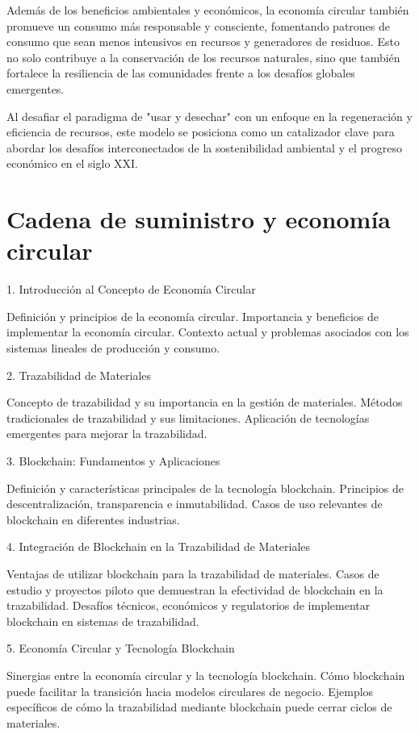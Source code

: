 \documentclass[main.tex]{subfiles}
\begin{document}
Además de los beneficios ambientales y económicos, la economía circular también promueve un consumo más responsable y consciente, fomentando patrones de consumo que sean menos intensivos en recursos y generadores de residuos. Esto no solo contribuye a la conservación de los recursos naturales, sino que también fortalece la resiliencia de las comunidades frente a los desafíos globales emergentes.

Al desafiar el paradigma de "usar y desechar" con un enfoque en la regeneración y eficiencia de recursos, este modelo se posiciona como un catalizador clave para abordar los desafíos interconectados de la sostenibilidad ambiental y el progreso económico en el siglo XXI.

\section{Cadena de suministro y economía circular}

1. Introducción al Concepto de Economía Circular

    Definición y principios de la economía circular.
    Importancia y beneficios de implementar la economía circular.
    Contexto actual y problemas asociados con los sistemas lineales de producción y consumo.

2. Trazabilidad de Materiales

    Concepto de trazabilidad y su importancia en la gestión de materiales.
    Métodos tradicionales de trazabilidad y sus limitaciones.
    Aplicación de tecnologías emergentes para mejorar la trazabilidad.

3. Blockchain: Fundamentos y Aplicaciones

    Definición y características principales de la tecnología blockchain.
    Principios de descentralización, transparencia e inmutabilidad.
    Casos de uso relevantes de blockchain en diferentes industrias.

4. Integración de Blockchain en la Trazabilidad de Materiales

    Ventajas de utilizar blockchain para la trazabilidad de materiales.
    Casos de estudio y proyectos piloto que demuestran la efectividad de blockchain en la trazabilidad.
    Desafíos técnicos, económicos y regulatorios de implementar blockchain en sistemas de trazabilidad.

5. Economía Circular y Tecnología Blockchain

    Sinergias entre la economía circular y la tecnología blockchain.
    Cómo blockchain puede facilitar la transición hacia modelos circulares de negocio.
    Ejemplos específicos de cómo la trazabilidad mediante blockchain puede cerrar ciclos de materiales.
\end{document}
